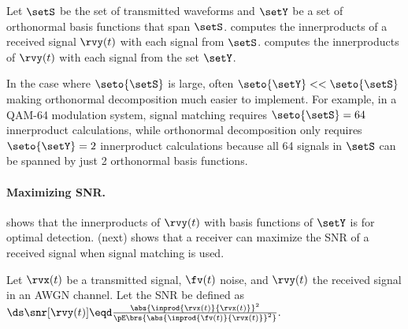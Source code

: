 Let $\setS$ be the set of transmitted waveforms and
$\setY$ be a set of orthonormal basis functions that span $\setS$.
 computes the innerproducts of a
received signal $\rvy(t)$ with each signal from $\setS$.
 computes the innerproducts of
$\rvy(t)$ with each signal from the set $\setY$.

In the case where $\seto{\setS}$ is large, often $\seto{\setY}<<\seto{\setS}$
making orthonormal decomposition much easier to implement.
For example, in a QAM-64 modulation system,
signal matching requires $\seto{\setS}=64$ innerproduct calculations,
while orthonormal decomposition only requires $\seto{\setY}=2$
innerproduct calculations because all 64 signals in $\setS$ can be spanned
by just 2 orthonormal basis functions.

\paragraph{Maximizing SNR.}
 shows that the innerproducts of $\rvy(t)$ with
basis functions of $\setY$ is  for optimal detection.
 (next) shows that a receiver can
maximize the SNR of a received signal when signal matching is used.

\begin{theorem}
\label{thm:mf_maxSNR}
Let $\rvx(t)$ be a transmitted signal, $\fv(t)$ noise, and $\rvy(t)$ the received signal
in an AWGN channel.
Let the  SNR be defined as
\\\indentx$\ds
      \snr[\rvy(t)] \eqd \frac{\abs{\inprod{\rvx(t)}{\rvx(t)}}^2}
                            {\pE\brs{\abs{\inprod{\fv(t)}{\rvx(t)}}^2}}.
          $
\end{theorem}

